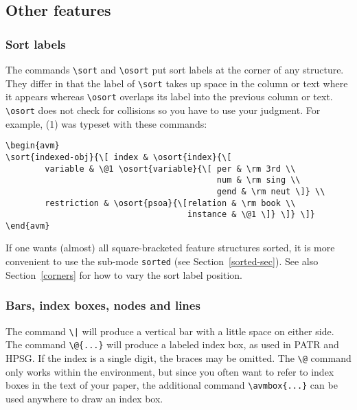 \subsection{Other features}

\subsubsection{Sort labels}

The commands \verb+\sort+ and \verb+\osort+ put sort labels at the
corner of any structure.  They differ in that the label of
\verb+\sort+ takes up space in the column or text where it appears whereas
\verb+\osort+ overlaps its label into the previous column or text.
\verb+\osort+ does not check for collisions so you have to use your
judgment.  For example, (1) was typeset with these commands:
%
\begin{example}\label{firstverbatim}
{\obeyspaces\begin{verbatim}
\begin{avm}
\sort{indexed-obj}{\[ index & \osort{index}{\[
        variable & \@1 \osort{variable}{\[ per & \rm 3rd \\
                                           num & \rm sing \\
                                           gend & \rm neut \]} \\
        restriction & \osort{psoa}{\[relation & \rm book \\
                                     instance & \@1 \]} \]} \]}
\end{avm}
\end{verbatim}}
\end{example}
%
If one wants (almost) all square-bracketed feature structures sorted,
it is more convenient to use the sub-mode \verb+sorted+ (see
Section~\ref{sorted-sec}).   See also Section~\ref{corners} for how to vary
the sort label position.

\subsubsection{Bars, index boxes, nodes and lines}

The command \verb+\|+ will produce a vertical bar with a
little space on either side.  The command \verb+\@{...}+ will produce a
labeled index box, as used in PATR and HPSG.  If the index is a single
digit, the braces may be omitted.  The \verb+\@+ command only works within
the {\AVM} environment, but since you often want to refer to index boxes in
the text of your paper, the additional command \verb+\avmbox{...}+ can be
used anywhere to draw an index box.

